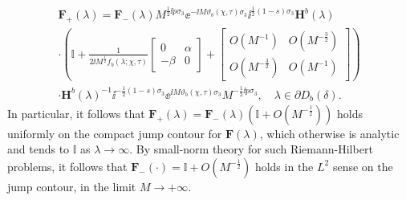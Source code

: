 \begin{multline}
\mathbf{F}_+(\lambda)=\mathbf{F}_-(\lambda)
M^{\frac{1}{2}\ii p\sigma_3}\ee^{-\ii M\vartheta_b(\chi,\tau)\sigma_3}\ii^{\frac{1}{2}(1-s)\sigma_3}\mathbf{H}^b(\lambda)\\
\cdot 
\left(\mathbb{I}+\frac{1}{2\ii M^{\frac{1}{2}}f_b(\lambda;\chi,\tau)}\begin{bmatrix}0 & \alpha\\-\beta & 0\end{bmatrix}+\begin{bmatrix}O(M^{-1}) & O(M^{-\frac{3}{2}})\\O(M^{-\frac{3}{2}}) & O(M^{-1})\end{bmatrix}\right)\\
\cdot\mathbf{H}^b(\lambda)^{-1}\ii^{-\frac{1}{2}(1-s)\sigma_3}\ee^{\ii M\vartheta_b(\chi,\tau)\sigma_3}M^{-\frac{1}{2}\ii p\sigma_3},\quad\lambda\in\partial D_b(\delta).
\label{eq:Channels-VF-partialDb-ALT}
\end{multline}
In particular, it follows that 
$\mathbf{F}_+(\lambda)=\mathbf{F}_-(\lambda)(\mathbb{I}+O(M^{-\frac{1}{2}}))$ 
holds uniformly on the compact jump contour for $\mathbf{F}(\lambda)$, which otherwise is analytic and tends to $\mathbb{I}$ as $\lambda\to\infty$.  By small-norm theory for such Riemann-Hilbert problems, it follows that 
$\mathbf{F}_-(\cdot)=\mathbb{I}+O(M^{-\frac{1}{2}})$ 
holds in the $L^2$ sense on the jump contour, in the limit 
$M\to+\infty$.

